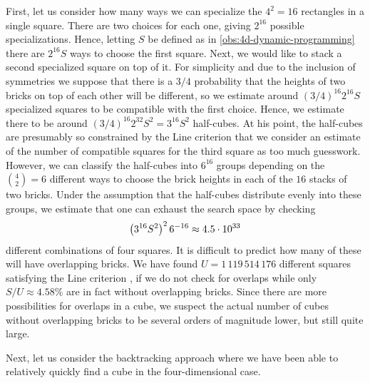 First, let us consider how many ways we can specialize the $4^2 = 16$ rectangles in a single square. There are two choices for each one, giving $2^{16}$ possible specializations. Hence, letting $S$ be defined as in \cref{obs:4d-dynamic-programming} there are $2^{16} S$ ways to choose the first square. Next, we would like to stack a second specialized square on top of it. For simplicity and due to the inclusion of symmetries we suppose that there is a $3/4$ probability that the heights of two bricks on top of each other will be different, so we estimate around $(3/4)^{16} 2^{16} S$ specialized squares to be compatible with the first choice. Hence, we estimate there to be around $(3/4)^{16} 2^{32} S^2 = 3^{16} S^2$ half-cubes. At his point, the half-cubes are presumably so constrained by the Line criterion  that we consider an estimate of the number of compatible squares for the third square as too much guesswork. However, we can classify the half-cubes into $6^{16}$ groups depending on the $\binom{4}{2} = 6$ different ways to choose the brick heights in each of the $16$ stacks of two bricks. Under the assumption that the half-cubes distribute evenly into these groups, we estimate that one can exhaust the search space by checking
\[
\left( 3^{16} S^2 \right)^2 6^{-16} \approx 4.5 \cdot 10^{33}
\]
different combinations of four squares. It is difficult to predict how many of these will have overlapping bricks. We have found $U = 1\,119\,514\,176$ different squares satisfying the Line criterion , if we do not check for overlaps while only $S/U \approx 4.58\%$ are in fact without overlapping bricks. Since there are more possibilities for overlaps in a cube, we suspect the actual number of cubes without overlapping bricks to be several orders of magnitude lower, but still quite large.

Next, let us consider the backtracking approach where we have been able to relatively quickly find a cube in the four-dimensional case.

